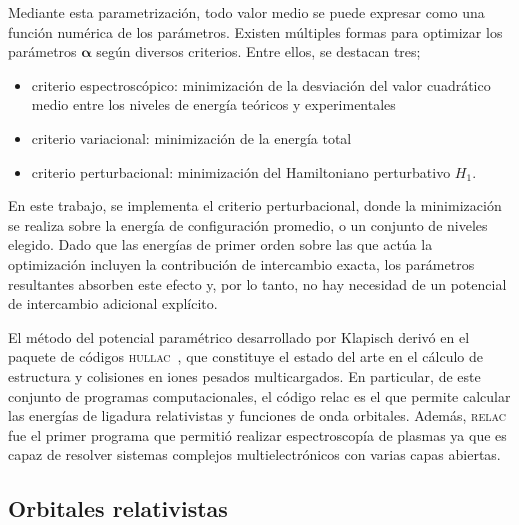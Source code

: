 Mediante esta parametrización, todo valor medio se puede expresar como 
una función numérica de los parámetros. Existen múltiples formas 
para optimizar los parámetros $\boldsymbol{\alpha}$ según diversos 
criterios. Entre ellos, se destacan tres;
\begin{itemize}
\item criterio espectroscópico: minimización de la desviación del valor 
cuadrático medio entre los niveles de energía teóricos y experimentales
\item criterio variacional: minimización de la energía total
\item criterio perturbacional: minimización del Hamiltoniano perturbativo
$H_1$. 
\end{itemize}
En este trabajo, se implementa el criterio perturbacional, donde la 
minimización se realiza sobre la energía de configuración promedio, o 
un conjunto de niveles elegido. Dado que las energías de primer orden 
sobre las que actúa la optimización incluyen la contribución de 
intercambio exacta, los parámetros resultantes absorben este efecto y, 
por lo tanto, no hay necesidad de un potencial de intercambio adicional 
explícito.

El método del potencial paramétrico desarrollado por Klapisch derivó en
el paquete de códigos \textsc{hullac}~\cite{BarShalom:01}, que constituye 
el estado del arte en el cálculo de estructura y colisiones en iones 
pesados multicargados.  
En particular, de este conjunto de programas computacionales, el código 
{\sc relac} es el que permite calcular las energías de ligadura 
relativistas y funciones de onda orbitales. Además, \textsc{relac} fue 
el primer programa que permitió realizar espectroscopía de plasmas ya 
que es capaz de resolver sistemas complejos multielectrónicos con varias 
capas abiertas. 

\subsection{Orbitales relativistas}

